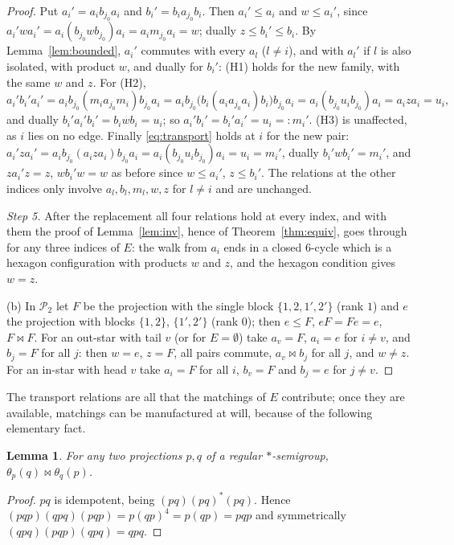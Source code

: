 \documentclass[11pt]{amsart}
\newtheorem{lemma}[theorem]{Lemma}
\theoremstyle{definition}
\renewcommand{\P}{\mathcal{P}}
\newcommand{\mt}{\bowtie}   %
\begin{document}
\begin{proof}
Put $a_i'=a_ib_{j_0}a_i$ and $b_i'=b_ia_{j_0}b_i$. Then $a_i'\le a_i$ and $w\le a_i'$, since $a_i'wa_i'=a_i(b_{j_0}wb_{j_0})a_i=a_im_{j_0}a_i=w$; dually $z\le b_i'\le b_i$. By Lemma~\ref{lem:bounded}, $a_i'$ commutes with every $a_l$ ($l\ne i$), and with $a_l'$ if $l$ is also isolated, with product $w$, and dually for $b_i'$: (H1) holds for the new family, with the same $w$ and $z$. For (H2),
\[
a_i'b_i'a_i'=a_ib_{j_0}(m_ia_{j_0}m_i)b_{j_0}a_i=a_ib_{j_0}\bigl(b_i(a_ia_{j_0}a_i)b_i\bigr)b_{j_0}a_i=a_i(b_{j_0}u_ib_{j_0})a_i=a_iza_i=u_i ,
\]
and dually $b_i'a_i'b_i'=b_iwb_i=u_i$; so $a_i'b_i'=b_i'a_i'=u_i=:m_i'$. (H3) is unaffected, as $i$ lies on no edge. Finally \eqref{eq:transport} holds at $i$ for the new pair: $a_i'za_i'=a_ib_{j_0}(a_iza_i)b_{j_0}a_i=a_i(b_{j_0}u_ib_{j_0})a_i=u_i=m_i'$, dually $b_i'wb_i'=m_i'$, and $za_i'z=z$, $wb_i'w=w$ as before since $w\le a_i'$, $z\le b_i'$. The relations at the other indices only involve $a_l,b_l,m_l,w,z$ for $l\ne i$ and are unchanged.

\emph{Step 5.} After the replacement all four relations hold at every index, and with them the proof of Lemma~\ref{lem:inv}, hence of Theorem~\ref{thm:equiv}, goes through for any three indices of $E$: the walk from $a_i$ ends in a closed $6$-cycle which is a hexagon configuration with products $w$ and $z$, and the hexagon condition gives $w=z$.

(b) In $\P_2$ let $F$ be the projection with the single block $\{1,2,1',2'\}$ (rank $1$) and $e$ the projection with blocks $\{1,2\}$, $\{1',2'\}$ (rank $0$); then $e\le F$, $eF=Fe=e$, $F\mt F$. For an out-star with tail $v$ (or for $E=\emptyset$) take $a_v=F$, $a_i=e$ for $i\ne v$, and $b_j=F$ for all $j$: then $w=e$, $z=F$, all pairs commute, $a_v\mt b_j$ for all $j$, and $w\ne z$. For an in-star with head $v$ take $a_i=F$ for all $i$, $b_v=F$ and $b_j=e$ for $j\ne v$.
\end{proof}

The transport relations are all that the matchings of $E$ contribute; once they are available, matchings can be manufactured at will, because of the following elementary fact.

\begin{lemma}\label{lem:friends}
For any two projections $p,q$ of a regular $*$-semigroup, $\theta_p(q)\mt\theta_q(p)$.
\end{lemma}
\begin{proof}
$pq$ is idempotent, being $(pq)(pq)^*(pq)$. Hence $(pqp)(qpq)(pqp)=p(qp)^4=p(qp)=pqp$ and symmetrically $(qpq)(pqp)(qpq)=qpq$.
\end{proof}
\end{document}
